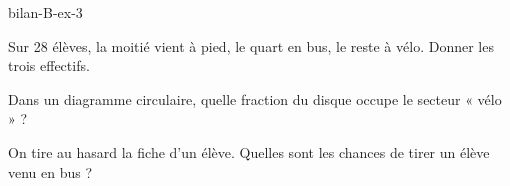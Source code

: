 \begin{blocEdition}{bilan-B-ex-3}
\begin{questions}
\item Sur 28 élèves, la moitié vient à pied, le quart en bus, le reste à vélo. Donner les trois effectifs.
\item Dans un diagramme circulaire, quelle fraction du disque occupe le secteur « vélo » ?
\item On tire au hasard la fiche d’un élève. Quelles sont les chances de tirer un élève venu en bus ?
\end{questions}\par{}\par\par{}\par{}\par{}\par{}\par{}\par{}
\end{blocEdition}

